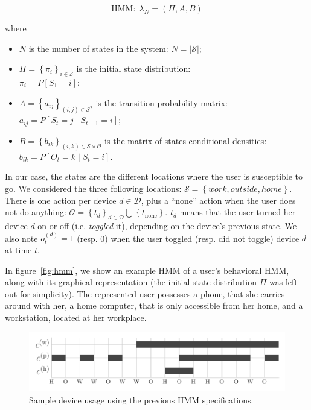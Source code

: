 $$\text{HMM}:\;\lambda_N=(\Pi, A, B)$$

where 
\begin{itemize}
	\item $N$ is the number of states in the system:
	$N = \left| \mathcal{S} \right|$;

	\item $\Pi=\left\{ \pi_i\right\}_{i\in\mathcal{S}}$ is the initial state distribution:\\
	$\pi_i=P[S_1=i]$;

	\item $A = \left\{ a_{ij}\right\}_{(i,j)\in\mathcal{S}^2}$ is the transition probability matrix:\\
	$a_{ij}=P[S_t=j \mid S_{t-1}=i]$;

	\item $B = \left\{ b_{ik}\right\}_{(i,k)\in\mathcal{S}\times\mathcal{O}}$ is the matrix of states conditional densities:
	$b_{ik} = P[O_t=k \mid S_t = i]$.
\end{itemize}

In our case, the states are the different locations where the user is susceptible to go.
We considered the three following locations: $\mathcal{S}=\left\{ \mathit{work}, \mathit{outside}, \mathit{home} \right\}$. 
There is one action per device $d\in\mathcal{D}$, plus a ``none'' action when the user does not do anything: 
$\mathcal{O} = \left\{ t_d \right\}_{d\in \mathcal{D}} \bigcup \left\{ t_\text{none} \right\}$.
$t_d$ means that the user turned her device $d$ on or off (i.e. \emph{toggled} it), depending on the device's previous state.
 We also note $o^{(d)}_t=1$ (resp. 0) when the user toggled (resp. did not toggle) device $d$ at time $t$.

In figure~\ref{fig:hmm}, we show an example HMM of a user's behavioral HMM, along with its graphical representation (the initial state distribution $\Pi$ was left out for simplicity). 
The represented user possesses a phone, that she carries around with her, a home computer, that is only accessible from her home, and a workstation, located at her workplace.

\begin{figure}[t]
\centering
\includegraphics[width=\columnwidth]{figures/sample_usage.pdf}

\caption{\label{fig:sample_usage}Sample device usage using the previous HMM specifications. 
}

\end{figure}


